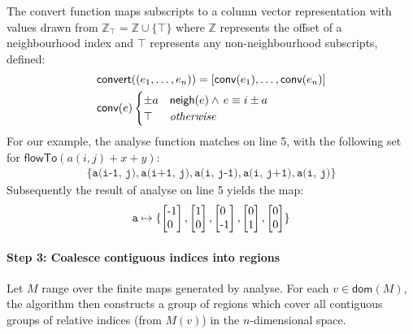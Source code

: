 \documentclass[9pt]{sigplanconf}
\theoremstyle{definition}
\begin{document}
The \textsf{convert} function maps subscripts to a column vector
representation with values drawn from $\mathbb{Z}_\top = \mathbb{Z} \cup \{\top\}$
where $\mathbb{Z}$ represents the offset of a neighbourhood index
and $\top$ represents any non-neighbourhood subscripts, defined:
%
\begin{align*}
& \textsf{convert}((e_1, \ldots, e_n)) = [\textsf{conv}(e_1), \ldots,
  \textsf{conv}(e_n)] \\
& \textsf{conv}(e) \begin{cases}
\pm a & \textsf{neigh}(e) \wedge \, e \equiv i \pm a \\
\top & \textit{otherwise} 
\end{cases} 
\end{align*}
%
For our example, the \textsf{analyse} function matches on
line 5, with the following set for $\textsf{flowTo}(a(i, j) + x +
  y)$:
%
\begin{align*}
\{\texttt{a(i-1, j)}, \texttt{a(i+1, j)}, \texttt{a(i, j-1)},
  \texttt{a(i, j+1)}, \texttt{a(i, j)}\}
\end{align*}
Subsequently the result of \textsf{analyse} on line 5 yields the map:
\begin{align*}
\texttt{a} \mapsto \{\vtwo{-1}{0}, \vtwo{1}{0},
          \vtwo{0}{-1}, \vtwo{0}{1}, \vtwo{0}{0}\}
\end{align*}
%

\paragraph{Step 3: Coalesce contiguous indices into regions}

Let $M$ range over the finite maps generated by \textsf{analyse}.  For
each $v \in \mathsf{dom}(M)$, the algorithm then constructs a group
of regions which cover all contiguous groups of relative indices
(from $M(v)$) in the $n$-dimensional space. 
\end{document}
